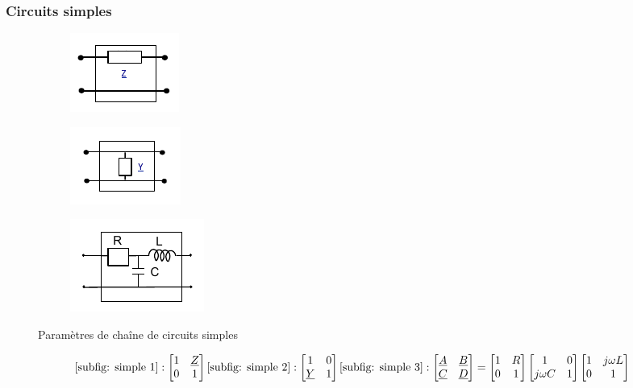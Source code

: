 \documentclass[12pt,a4paper]{article}
\newcommand{\uz}{\uline{Z} }
\newcommand{\uy}{\uline{Y} }
\newcommand{\ua}{\uline{A} }
\newcommand{\ub}{\uline{B} }
\newcommand{\uc}{\uline{C} }
\newcommand{\ud}{\uline{D} }
\begin{document}
\subsubsection{Circuits simples}
\begin{figure}[!h]
	\centering
	\begin{subfigure}[b]{0.3\textwidth}
		\centering
		\includegraphics[scale=0.9]{images/chaine_simple_1}
		\caption{}
		\label{subfig: simple 1}
	\end{subfigure}
	\begin{subfigure}[b]{0.3\textwidth}
		\centering
		\includegraphics[scale=0.9]{images/chaine_simple_2}
		\caption{}
		\label{subfig: simple 2}
	\end{subfigure}
	\begin{subfigure}[b]{0.3\textwidth}
		\centering
		\includegraphics[scale=0.8]{images/chaine_simple_3}
		\caption{}
		\label{subfig: simple 3}
	\end{subfigure}
	\caption{Paramètres de chaîne de circuits simples}
\end{figure}
\begin{align}
	\ref{subfig: simple 1} : \begin{bmatrix}
		1 & \uz \\
		0 & 1
	\end{bmatrix}	
	\ref{subfig: simple 2} : \begin{bmatrix}
		1 & 0 \\
		\uy & 1
	\end{bmatrix}	
	\ref{subfig: simple 3} : \begin{bmatrix}
		\ua & \ub \\
		\uc & \ud
	\end{bmatrix} = \begin{bmatrix}
		1 & R \\
		0 & 1
	\end{bmatrix}\begin{bmatrix}
		1 & 0\\
		j\omega C & 1
	\end{bmatrix}\begin{bmatrix}
		1 & j\omega L \\
		0 & 1
	\end{bmatrix}
\end{align}
\end{document}

